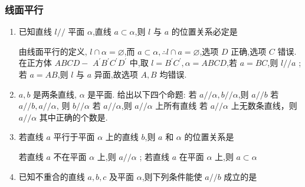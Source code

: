 \subsubsection*{线面平行}
\begin{enumerate}
    \item 已知直线 $l//$ 平面 $\alpha$,直线 $a \subset  \alpha$,则 $l$ 与 $a$ 的位置关系必定是
    \begin{jieda}
        由线面平行的定义, $l \cap  \alpha  = \varnothing$,而 $a \subset  \alpha,\therefore l \cap  a = \varnothing$,选项 $D$ 正确,选项 $C$ 错误. 在正方体 ${ABCD} -$  ${A}^{\prime }{B}^{\prime }{C}^{\prime }{D}^{\prime }$ 中,取 $l = {B}^{\prime }{C}^{\prime },\alpha  = {ABCD}$,若 $a = {BC}$,则 $l//a$ ; 若 $a = {AB}$,则 $l$ 与 $a$ 异面,故选项 $A,B$ 均错误.
    \end{jieda}
    \item $a,b$ 是两条直线, $\alpha$ 是平面. 给出以下四个命题:
         若 $a//\alpha,b//\alpha$,则 $a//b$
         若 $a//b,a//\alpha$, 则 $b//\alpha$
         若 $a//\alpha$,则 $a//\alpha$ 上所有直线
         若 $a//\alpha$ 上无数条直线，则 $a//\alpha$
    其中正确的个数是.
    \begin{jieda}
    \end{jieda}
    \item 若直线 $a$ 平行于平面 $\alpha$ 上的直线 $b$,则 $a$ 和 $\alpha$ 的位置关系是
    \begin{jieda}
        若直线 $a$ 不在平面 $\alpha$ 上,则 $a//\alpha$ ; 若直线 $a$ 在平面 $\alpha$ 上,则 $a \subset  \alpha$
    \end{jieda}
    \item 已知不重合的直线 $a,b,c$ 及平面 $\alpha$,则下列条件能使 $a//b$ 成立的是 
    \begin{jieda}

\end{jieda}
\end{enumerate}
